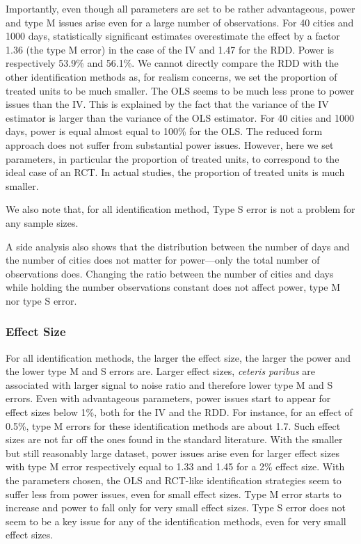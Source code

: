 \documentclass[12pt]{article}
\begin{document}
            Importantly, even though all parameters are set to be rather advantageous, power and type M issues arise even for a large number of observations. For 40 cities and 1000 days, statistically significant estimates overestimate the effect by a factor 1.36 (the type M error) in the case of the IV and 1.47 for the RDD. Power is respectively 53.9\% and 56.1\%. We cannot directly compare the RDD with the other identification methods as, for realism concerns, we set the proportion of treated units to be much smaller. The OLS seems to be much less prone to power issues than the IV. This is explained by the fact that the variance of the IV estimator is larger than the variance of the OLS estimator. For 40 cities and 1000 days, power is equal almost equal to 100\% for the OLS. The reduced form approach does not suffer from substantial power issues. However, here we set parameters, in particular the proportion of treated units, to correspond to the ideal case of an RCT. In actual studies, the proportion of treated units is much smaller.
            
            We also note that, for all identification method, Type S error is not a problem for any sample sizes. 
            
            A side analysis also shows that the distribution between the number of days and the number of cities does not matter for power---only the total number of observations does. Changing the ratio between the number of cities and days while holding the number observations constant does not affect power, type M nor type S error.
            
        \subsubsection{Effect Size}
        
            For all identification methods, the larger the effect size, the larger the power and the lower type M and S errors are. Larger effect sizes, \textit{ceteris paribus} are associated with larger signal to noise ratio and therefore lower type M and S errors. Even with advantageous parameters, power issues start to appear for effect sizes below 1\%, both for the IV and the RDD. For instance, for an effect of 0.5\%, type M errors for these identification methods are about 1.7. Such effect sizes are not far off the ones found in the standard literature. With the smaller but still reasonably large dataset, power issues arise even for larger effect sizes with type M error respectively equal to 1.33 and 1.45 for a 2\% effect size. With the parameters chosen, the OLS and RCT-like identification strategies seem to suffer less from power issues, even for small effect sizes. Type M error starts to increase and power to fall only for very small effect sizes. Type S error does not seem to be a key issue for any of the identification methods, even for very small effect sizes.
\end{document}
